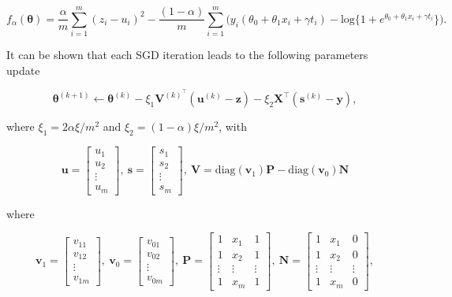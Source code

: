 \documentclass{article}
\def\X{\mathbf X}
\begin{document}
\begin{equation}
    f_{\alpha}(\boldsymbol{\theta}) = \frac{\alpha }{m} \sum_{i=1}^m (z_i - u_i)^2 
    - \frac{(1 - \alpha)}{m} \sum_{i=1}^m \Big( y_i (\theta_0 + \theta_1 x_i + \gamma t_i) - \mathrm{log}\{1 + e^{\theta_0 + \theta_1 x_i + \gamma t_i}  \} \Big).
    \label{eq:obj_simple_details}
\end{equation}

It can be shown that each SGD iteration leads to the following parameters update

\begin{equation}
    \boldsymbol{\theta}^{(k+1)} \leftarrow \boldsymbol{\theta}^{(k)} - \xi_1 \mathbf{V}^{(k)^{\top}}(\mathbf{u}^{(k)} - \mathbf{z}) - \xi_2 \X^{\top}(\mathbf{s}^{(k)} - \mathbf{y}),
    \label{eq:sgd_update}
\end{equation}

where $\xi_1 = 2\alpha\xi/m^2$ and $\xi_2 = (1-\alpha)\xi/m^2$, with 

\[
\mathbf{u} = 
\begin{bmatrix}
u_1 \\ u_2 \\ \vdots \\ u_m
\end{bmatrix},~
\mathbf{s} = 
\begin{bmatrix}
s_1 \\ s_2 \\ \vdots \\ s_m
\end{bmatrix},~
\mathbf{V} = \mathrm{diag}(\mathbf{v}_1) \mathbf{P} - \mathrm{diag}(\mathbf{v}_0) \mathbf{N}
\]

where

\[
\mathbf{v}_1 = 
\begin{bmatrix}
v_{11} \\ v_{12} \\ \vdots \\ v_{1m}
\end{bmatrix},~
\mathbf{v}_0 = 
\begin{bmatrix}
v_{01} \\ v_{02} \\ \vdots \\ v_{0m}
\end{bmatrix},~
\mathbf{P} = 
\begin{bmatrix}
1 & x_1 & 1 \\ 1 & x_2 & 1 \\ \vdots & \vdots & \vdots \\ 1 & x_m & 1
\end{bmatrix},~
\mathbf{N} = 
\begin{bmatrix}
1 & x_1 & 0 \\ 1 & x_2 & 0 \\ \vdots & \vdots & \vdots \\ 1 & x_m & 0
\end{bmatrix},
\]
\end{document}
